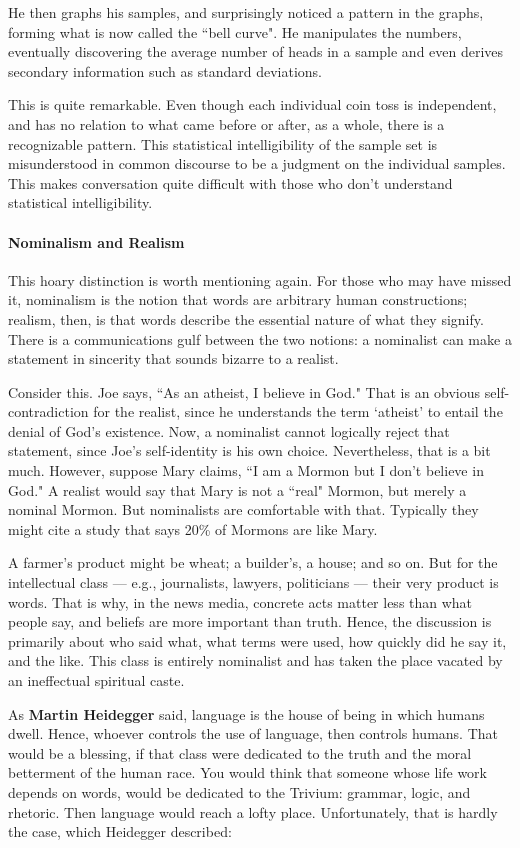 He then graphs his samples, and surprisingly noticed a pattern in the graphs, forming what is now called the ``bell curve". He manipulates the numbers, eventually discovering the average number of heads in a sample and even derives secondary information such as standard deviations.

This is quite remarkable. Even though each individual coin toss is independent, and has no relation to what came before or after, as a whole, there is a recognizable pattern. This statistical intelligibility of the sample set is misunderstood in common discourse to be a judgment on the individual samples. This makes conversation quite difficult with those who don't understand statistical intelligibility.

\paragraph{Nominalism and Realism}
This hoary distinction is worth mentioning again. For those who may have missed it, nominalism is the notion that words are arbitrary human constructions; realism, then, is that words describe the essential nature of what they signify. There is a communications gulf between the two notions: a nominalist can make a statement in sincerity that sounds bizarre to a realist.

Consider this. Joe says, ``As an atheist, I believe in God." That is an obvious self-contradiction for the realist, since he understands the term `atheist' to entail the denial of God's existence. Now, a nominalist cannot logically reject that statement, since Joe's self-identity is his own choice. Nevertheless, that is a bit much. However, suppose Mary claims, ``I am a Mormon but I don't believe in God." A realist would say that Mary is not a ``real" Mormon, but merely a nominal Mormon. But nominalists are comfortable with that. Typically they might cite a study that says 20\% of Mormons are like Mary.

A farmer's product might be wheat; a builder's, a house; and so on. But for the intellectual class — e.g., journalists, lawyers, politicians — their very product is words. That is why, in the news media, concrete acts matter less than what people say, and beliefs are more important than truth. Hence, the discussion is primarily about who said what, what terms were used, how quickly did he say it, and the like. This class is entirely nominalist and has taken the place vacated by an ineffectual spiritual caste.

As \textbf{Martin Heidegger} said, language is the house of being in which humans dwell. Hence, whoever controls the use of language, then controls humans. That would be a blessing, if that class were dedicated to the truth and the moral betterment of the human race. You would think that someone whose life work depends on words, would be dedicated to the Trivium: grammar, logic, and rhetoric. Then language would reach a lofty place. Unfortunately, that is hardly the case, which Heidegger described:

